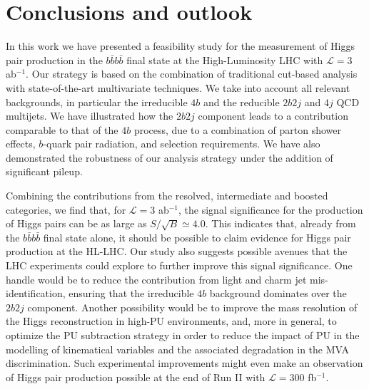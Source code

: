 \section{Conclusions and outlook}
\label{sec:conclusions}

In this work we have presented a feasibility study for
 the measurement of Higgs pair production in the $b\bar{b}b\bar{b}$
final state at the High-Luminosity LHC with $\mathcal{L}=3$ ab$^{-1}$.
%
Our strategy is based on the combination of traditional
cut-based analysis with state-of-the-art multivariate techniques.
%
We take into account 
all relevant backgrounds, in particular
the irreducible $4b$
and the reducible 
$2b2j$ and $4j$ QCD multijets.
%
We have illustrated how the $2b2j$ component leads to
a contribution comparable to that of the $4b$ process,
due to a combination of  parton shower effects, $b$-quark 
pair radiation, and selection requirements.
%
We have also demonstrated the robustness of our analysis strategy
under the addition of significant pileup.

Combining the contributions from the resolved,
intermediate and boosted categories, we find that, for
$\mathcal{L}=3$ ab$^{-1}$, the
signal significance for
the production of Higgs pairs can be as large as $S/\sqrt{B}\simeq 4.0$.
%
This indicates that, already from the $b\bar{b}b\bar{b}$
final state alone,
it should be possible to claim evidence for Higgs pair production at
the HL-LHC.
%
Our study also suggests possible avenues that the LHC experiments
could explore to further improve this signal significance.
%
One handle would be to reduce the contribution from light and charm
jet mis-identification, ensuring that the irreducible $4b$ background 
 dominates over the $2b2j$ component.
%
Another possibility would be to improve the mass resolution of the Higgs
reconstruction
in high-PU environments, and, more in general,
to optimize the PU subtraction
strategy in order
to reduce the impact of PU in the modelling
of kinematical variables and the associated
degradation in the MVA discrimination.
%
Such experimental improvements might
even make
an observation of Higgs pair production possible at the
end of Run II with
$\mathcal{L}=300$ fb$^{-1}$.

